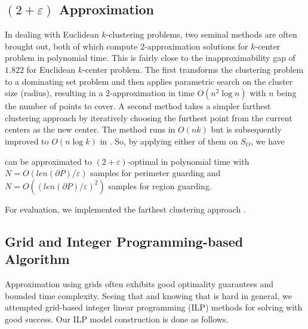 \subsection{$(2 + \varepsilon)$ Approximation}
In dealing with Euclidean $k$-clustering problems, two seminal methods 
are often brought out, both of which compute $2$-approximation solutions
for $k$-center problem in polynomial time. This is fairly close to the 
inapproximability gap of $1.822$ for Euclidean $k$-center
problem\cite{feder1988optimal}. The first 
\cite{hochbaum1985best, vazirani2013approximation} transforms the 
clustering problem to a dominating set problem and then applies parametric 
search on the cluster size (radius), resulting in a $2$-approximation in 
time $O(n^2\log n)$ with $n$ being the number of points to cover. 
A second method \cite{gonzalez1985clustering} takes 
a simpler farthest clustering approach by iteratively choosing the 
furthest point from the current centers as the new center. The method runs 
in $O(nk)$ but is subsequently improved to $O(n\log k)$ in 
\cite{feder1988optimal}. So, by applying either of them on $S_O$, we have

\begin{proposition}
    \osgt can be approximated to $(2 +\varepsilon)$-optimal in polynomial time 
		with $N=O({len(\partial P)}/{\varepsilon})$ samples for perimeter 
		guarding and $N=O(({len(\partial P)}/{\varepsilon})^2)$ samples for
    region guarding.
\end{proposition}

For evaluation, we implemented the farthest clustering approach 
\cite{gonzalez1985clustering}.

\subsection{Grid and Integer Programming-based Algorithm}
Approximation using grids \cite{har2011geometric} often exhibits good 
optimality guarantees and bounded time complexity. Seeing that and knowing
that \osgt is hard in general, we attempted grid-based integer linear programming 
(ILP) methods for solving \osgt with good success. Our ILP model 
construction is done as follows. 


